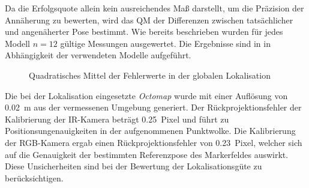 Da die Erfolgsquote allein kein ausreichendes Maß darstellt, um die Präzision der Annäherung zu bewerten, wird das QM der Differenzen zwischen tatsächlicher und angenäherter Pose bestimmt. Wie bereits beschrieben wurden für jedes Modell $n=12$ gültige Messungen ausgewertet. Die Ergebnisse sind in  in Abhängigkeit der verwendeten Modelle aufgeführt.


\prever{
}

\begin{figure}[!ht]

\caption{Quadratisches Mittel der Fehlerwerte in der globalen Lokalisation}
\label{fig.glob_loc}
\end{figure}

\vspace{5mm}

\prever{
}

Die bei der Lokalisation eingesetzte \textit{Octomap} wurde mit einer Auflösung von \SI{0,02}{\meter} aus der vermessenen Umgebung generiert. Der Rückprojektionsfehler der Kalibrierung der IR-Kamera beträgt \SI{0,25}{Pixel} und führt zu Positionsungenauigkeiten in der aufgenommenen Punktwolke. Die Kalibrierung der RGB-Kamera ergab einen Rückprojektionsfehler von \SI{0,23}{Pixel}, welcher sich auf die Genauigkeit der bestimmten Referenzpose des Markerfeldes auswirkt. Diese Unsicherheiten sind bei der Bewertung der Lokalisationsgüte zu berücksichtigen.\\

